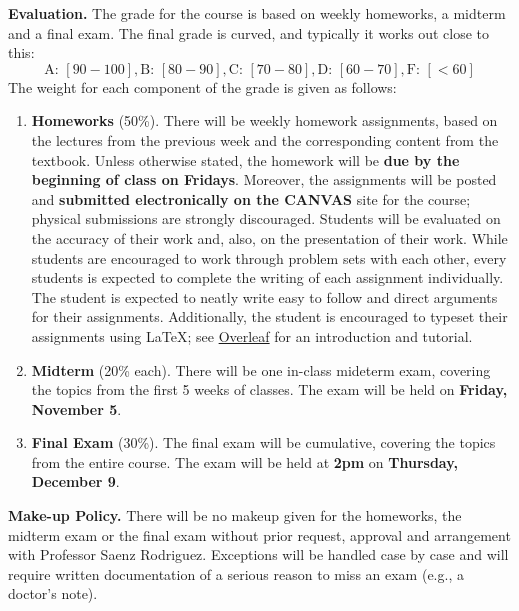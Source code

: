 \documentclass{article}
\begin{document}
\bigskip

\noindent \textbf{Evaluation.}
The grade for the course is based on weekly homeworks, a midterm and a final exam. The final grade is curved, and typically it works out close to this:
\[
\text{A:} \,\, [90-100], \text{B:} \,\, [80-90], \text{C:} \,\, [70-80], \text{D:} \,\, [60-70], \text{F:} \,\, [< 60]
\]
The weight for each component of the grade is given as follows:
\begin{enumerate}
\item \textbf{Homeworks} (50\%). There will be weekly homework assignments, based on the lectures from the previous week and the corresponding content from the textbook. Unless otherwise stated, the homework will be \textbf{due by the beginning of class on Fridays}. Moreover, the assignments will be posted and \textbf{submitted electronically on the CANVAS} site for the course; physical submissions are strongly discouraged.  Students will be evaluated on the accuracy of their work and, also, on the presentation of their work. While students are encouraged to work through problem sets with each other, every students is expected to complete the writing of each assignment individually. The student is expected to neatly write easy to follow and direct arguments for their assignments. Additionally, the student is encouraged to typeset their assignments using LaTeX; see \href{https://www.overleaf.com/learn/latex/Tutorials}{Overleaf} for an introduction and tutorial.
\item \textbf{Midterm} (20\% each). There will be one in-class mideterm exam, covering the topics from the first 5 weeks of classes. The exam will be held on \textbf{Friday, November 5}.
\item \textbf{Final Exam} (30\%). The final exam will be cumulative, covering the topics from the entire course. The exam will be held at \textbf{2pm} on \textbf{Thursday, December 9}.
\end{enumerate}


\bigskip

\noindent \textbf{Make-up Policy.}  There will be no makeup given for the homeworks, the midterm exam or the final exam without prior request, approval and arrangement with Professor Saenz Rodriguez. Exceptions will be handled case by case and will require written documentation of a serious reason to miss an exam (e.g., a doctor's note).
\end{document}

